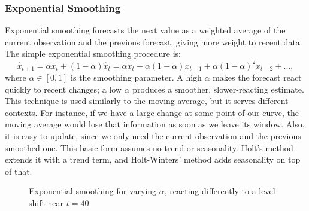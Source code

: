 \documentclass[12pt,a4paper]{article}
\begin{document}
\subsubsection*{Exponential Smoothing}
Exponential smoothing forecasts the next value as a weighted average of the current observation and the previous forecast, giving more weight to recent data. The simple exponential smoothing procedure is:
$$
\hat{x}_{t+1} = \alpha x_t + (1-\alpha)\hat{x}_t =  \alpha x_t + \alpha (1-\alpha)x_{t-1} + \alpha (1-\alpha)^2x_{t-2} + ... ,
$$
where $\alpha \in [0,1]$ is the smoothing parameter. A high $\alpha$ makes the forecast react quickly to recent changes; a low $\alpha$ produces a smoother, slower-reacting estimate.
This technique is used similarly to the moving average, but it serves different contexts. For instance, if we have a large change at some point of our curve, the moving average would lose that information as soon as we leave its window. Also, it is easy to update, since we only need the current observation and the previous smoothed one.
This basic form assumes no trend or seasonality. Holt's method extends it with a trend term, and Holt-Winters' method adds seasonality on top of that.
\begin{figure}[h]
	\centering
	\caption{Exponential smoothing for varying $\alpha$, reacting differently to a level shift near $t=40$.}
\end{figure}
\end{document}
